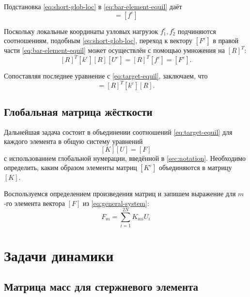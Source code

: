 \documentclass[10pt]{article}
\numberwithin{equation}{section}
\newcommand{\matr}[1]{[#1]}
\begin{document}
Подстановка \eqref{eq:short-glob-loc} в \eqref{eq:bar-element-equil} даёт
\begin{equation*}
  \matr{k^e}\matr{R}\matr{U^e}=\matr{f^e}
\end{equation*}

Поскольку локальные координаты узловых нагрузок $f_1^e, f_2^e$
подчиняются соотношениям, подобным \eqref{eq:short-glob-loc}, переход
к вектору $\matr{F^e}$ в правой части \eqref{eq:bar-element-equil}
может осуществлён с помощью умножения на $\matr{R}^T$:
\begin{equation}
  \label{eq:bar-global-equil}
  \matr{R}^T\matr{k^e}\matr{R}\matr{U^e}=\matr{R}^T\matr{f^e} = \matr{F^e}.
\end{equation}

Сопоставляя последнее уравнение с \eqref{eq:target-equil}, заключаем,
что
\begin{equation*}
  \matr{K^e} = \matr{R}^T\matr{k^e}\matr{R}.
\end{equation*}

\subsection{Глобальная матрица жёсткости}

Дальнейшая задача состоит в объединении соотношений
\eqref{eq:target-equil} для каждого элемента в общую систему уравнений
\begin{equation}
  \label{eq:general-system}
  \matr{K}\matr{U}=\matr{F}
\end{equation}
с использованием глобальной нумерации, введённой в \ref{sec:notation}.
Необходимо определить, каким образом элементы матриц $\matr{K^e}$
объединяются в матрицу $\matr{K}$.

Воспользуемся определением произведения матриц и запишем выражение для
$m$-го элемента вектора $\matr{F}$ из \eqref{eq:general-system}:
\begin{equation*}
  F_m = \sum_{i=1}^{2N}{K_{mi}U_i}
\end{equation*}


\section{Задачи динамики}

\subsection{Матрица масс для стержневого элемента}
\end{document}
